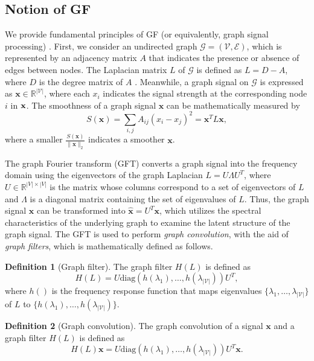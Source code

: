\documentclass[a4paper,fleqn]{cas-sc}
\renewcommand{\cite}{\citep}
\begin{document}
\subsection{Notion of GF}
We provide fundamental principles of GF (or equivalently, graph signal processing) \cite{DBLP:journals/pieee/OrtegaFKMV18, DBLP:conf/cikm/ShenWZSZLL21, DBLP:conf/sigir/ParkSS24}. First, we consider an undirected graph $\mathcal {G=(V,E)}$, which is represented by an adjacency matrix $A$ that indicates the presence or absence of edges between nodes. The Laplacian matrix $L$ of $\mathcal G$ is defined as $L=D-A$, where $D$ is the degree matrix of $A$ \cite{DBLP:journals/siamdm/GroneM94}. Meanwhile, a graph signal on $\mathcal G$ is expressed as $\mathbf{x} \in \mathbb R^{|\mathcal V|}$, where each $x_i$ indicates the signal strength at the corresponding node $i$ in ${\bf x}$. The smoothness of a graph signal $\mathbf{x}$ can be mathematically measured by
\begin{equation}
    S(\mathbf{x}) = \sum_{i,j}A_{ij}(x_i-x_j)^2 = \mathbf{x}^T L\mathbf{x},
\end{equation}
where a smaller $\frac{S(\mathbf{x})}{\|\mathbf{x}\|_2}$ indicates a smoother $\mathbf{x}$.

The graph Fourier transform (GFT) converts a graph signal into the frequency domain using the eigenvectors of the graph Laplacian $L=U\Lambda U^T$, where $U\in\mathbb R^{|V| \times |V|}$ is the matrix whose columns correspond to a set of eigenvectors of $L$ and $\Lambda$ is a diagonal matrix containing the set of eigenvalues of $L$. Thus, the graph signal $\mathbf{x}$ can be transformed into $\hat {\mathbf{x}} = U^T \mathbf{x}$, which utilizes the spectral characteristics of the underlying graph to examine the latent structure of the graph signal. The GFT is used to perform \textit{graph convolution}, with the aid of {\it graph filters}, which is mathematically defined as follows.

\textbf{Definition 1} (Graph filter). The graph filter $H(L)$ is defined as
\begin{equation}
H(L) = U \text{diag}(h(\lambda_1), \dots, h(\lambda_{|\mathcal{V}|})) U^T,
\end{equation}
where $h()$ is the frequency response function that maps eigenvalues $\{\lambda_1,\dots,\lambda_{|\mathcal{V}|}\}$ of $L$ to $\{h(\lambda_1),\dots,h(\lambda_{|\mathcal{V}|})\}$.

\textbf{Definition 2} (Graph convolution). The graph convolution of a signal $\mathbf{x}$ and a graph filter $H(L)$ is defined as
\begin{equation}
    H(L) \mathbf{x} = U \text{diag}(h(\lambda_1), \dots, h(\lambda_{|\mathcal{V}|})) U^T\mathbf{x}.
\end{equation}
\end{document}
